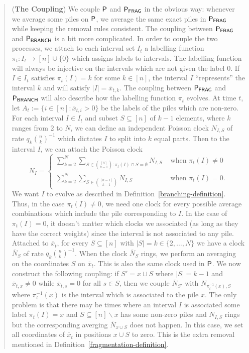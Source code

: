 \documentclass[12pt]{article}
\begin{document}
\begin{quote}
	(\textbf{The Coupling}) We couple $\mathsf{P}$ and $\mathsf{P}_{\mathsf{FRAG}}$ in the obvious way: whenever we average some piles on $\mathsf{P}$, we average the same exact piles in $\mathsf{P}_{\mathsf{FRAG}}$ while keeping the removal rules consistent. The coupling between $\mathsf{P}_{\mathsf{FRAG}}$ and $\mathsf{P}_{\mathsf{BRANCH}}$ is a bit more complicated. In order to couple the two processes, we attach to each interval set $I_t$ a labelling function $\pi_t : I_t \to [n] \cup \{0\}$ which assigns labels to intervals. The labelling function will always be injective on the intervals which are not given the label $0$. If $I \in I_t$ satisfies $\pi_t(I) = k$ for some $k \in [n]$, the interval $I$ ``represents'' the interval $k$ and will satisfy $|I| = \overline{x}_{t, k}$. The coupling between $\mathsf{P}_{\mathsf{FRAG}}$ and $\mathsf{P}_{\mathsf{BRANCH}}$ will also describe how the labelling function $\pi_t$ evolves. At time $t$, let $A_t := \{i \in [n] : \overline{x}_{t, i} > 0\}$ be the labels of the piles which are non-zero. For each interval $I \in I_t$ and subset $S \subseteq [n]$ of $k-1$ elements, where $k$ ranges from $2$ to $N$, we can define an independent Poisson clock $N_{I, S}$ of rate $q_k \binom{n}{k}^{-1}$ which dictates $I$ to split into $k$ equal parts. Then to the interval $I$, we can attach the Poisson clock
	\[
		N_I = \begin{cases}
			\sum_{k = 2}^N \sum_{S \in \binom{[n]}{k-1} : \pi_t(I) \cap S = \emptyset} N_{I, S} & \text{ when $\pi_t(I) \neq 0$} \\
			\sum_{k = 2}^N \sum_{S \in \binom{[n-1]}{k-1}} N_{I, S} & \text{ when $\pi_t(I) = 0$}.
		\end{cases}
	\]
	We want $I$ to evolve as described in Definition~\ref{branching-definition}. Thus, in the case $\pi_t(I) \neq 0$, we need one clock for every possible average combinations which include the pile corresponding to $I$. In the csae of $\pi_t(I) = 0$, it doesn't matter which clocks we associated (as long as they have the correct weights) since the interval is not associated to any pile. Attached to $\overline{x}_t$, for every $S \subseteq [n]$ with $|S| = k \in \{2, \ldots, N\}$ we have a clock $\overline{N}_S$ of rate $q_k \binom{n}{k}^{-1}$. When the clock $\overline{N}_S$ rings, we perform an averaging on the coordinates $S$ on $\overline{x}_t$. This is also the same clock used in $\mathsf{P}$. We now construct the following coupling: if $S' = x \sqcup S$ where $|S| = k-1$ and $\bar{x}_{t, x} \neq 0$ while $\overline{x}_{t,s} = 0$ for all $s \in S$, then we couple $\overline{N}_{S'}$ with $N_{\pi_t^{-1}(x), S}$ where $\pi_t^{-1}(x)$ is the interval which is associated to the pile $x$. The only problem is that there may be times where an interval $I$ is associated some label $\pi_t(I) = x$ and $S \subseteq [n] \backslash x$ has some non-zero piles and $N_{I, S}$ rings but the corresponding averging $\overline{N}_{x \cup S}$ does not happen. In this case, we set all coordinates of $\overline{x}_t$ in positions $x \cup S$ to zero. This is the extra removal mentioned in Definition~\ref{fragmentation-definition}. \\


\end{quote}
\end{document}
